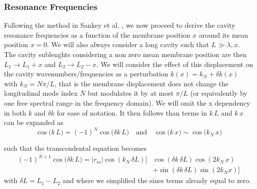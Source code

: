 \subsubsection{Resonance Frequencies}
Following the method in Sankey et al. \cite{sankey_strong_2010}, we now proceed to derive the cavity resonance frequencies as a function of the membrane position \(x\) around its mean position \(x=0\). We will also always consider a long cavity such that \( L \gg \lambda,x \). The cavity sublenghts considering a non zero mean membrane position are then \(L_1 \rightarrow L_1 +  x\) and \(L_2 \rightarrow L_2 -  x\). We will consider the effect of this displacement on the cavity wavenumbers/frequencies as a perturbation $k(x) = k_N + \delta k(x)$ with $k_N = N \pi/L$, that is the membrane displacement does not change the longitudinal mode index \(N\) but modulates it by at most $\pi/L$ (or equivalently by one free spectral range in the frequency domain). We will omit the x dependency in both $k$ and $\delta k$ for ease of notation. It then follows than terms in $k\, L$ and $k\, x$ can be expanded as
\begin{equation*}
    \cos \big( k \, L \big)  = (-1)^N \cos \big( \delta k \,L \big) \quad \text{and} \quad      \cos \big( k \, x \big)  \sim \cos \big( k_N \,  x \big)  
\end{equation*}

such that the transcendental equation becomes
\begin{equation}
  \begin{split}
  (-1)^{N+1} \cos \big( \delta k \,L \big) = |r_m|\cos (k_N \,\delta L) \Big[ &\cos( \delta k \,  \delta L) \cos (2 k_N\, x) \\ 
  & +  \sin(\delta k \,  \delta L) \sin(2 k_N x) \Big]  
  \end{split}
\end{equation}
with $\delta L = L_1 - L_2$ and where we simplified the sines terms already equal to zero. 

